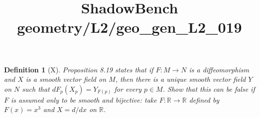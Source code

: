 \documentclass{article}
\title{ShadowBench geometry/L2/geo\_gen\_L2\_019}
\newtheorem{definition}{Definition}
\begin{document}
\maketitle

\begin{definition}[X]
Proposition 8.19 states that if $F: M \to N$ is a diffeomorphism and $X$ is a smooth vector field on $M$, then there is a unique smooth vector field $Y$ on $N$ such that $dF_p (X_p) = Y_{F(p)}$ for every $p \in M$. Show that this can be false if $F$ is assumed only to be smooth and bijective: take $F: \mathbb{R} \to \mathbb{R}$ defined by $F(x) = x^3$ and $X = d/dx$ on $\mathbb{R}$.
\end{definition}
\end{document}
